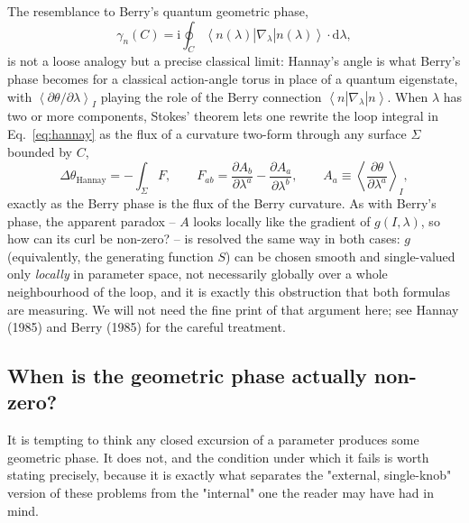 \documentclass[11pt]{book}
\newcommand{\dd}{\mathrm{d}}
\newcommand{\ii}{\mathrm{i}}
\newcommand{\avg}[1]{\left\langle #1 \right\rangle}
\begin{document}
The resemblance to Berry's quantum geometric phase,
\begin{equation}
\gamma_n(C) = \ii\oint_C \avg{n(\lambda)|\nabla_\lambda|n(\lambda)}\cdot\dd\lambda,
\end{equation}
is not a loose analogy but a precise classical limit: Hannay's angle is what Berry's phase becomes
for a classical action-angle torus in place of a quantum eigenstate, with
$\avg{\partial\theta/\partial\lambda}_I$ playing the role of the Berry connection
$\avg{n|\nabla_\lambda|n}$. When $\lambda$ has two or more components, Stokes' theorem lets one
rewrite the loop integral in Eq.~\eqref{eq:hannay} as the flux of a curvature two-form through any
surface $\Sigma$ bounded by $C$,
\begin{equation}
\Delta\theta_{\text{Hannay}} = -\int_\Sigma F, \qquad F_{ab} = \frac{\partial A_b}{\partial
\lambda^a} - \frac{\partial A_a}{\partial\lambda^b}, \qquad A_a \equiv
\avg{\frac{\partial\theta}{\partial\lambda^a}}_I,
\label{eq:curvature}
\end{equation}
exactly as the Berry phase is the flux of the Berry curvature. As with Berry's phase, the apparent
paradox -- $A$ looks locally like the gradient of $g(I,\lambda)$, so how can its curl be non-zero?
-- is resolved the same way in both cases: $g$ (equivalently, the generating function $S$) can be
chosen smooth and single-valued only \emph{locally} in parameter space, not necessarily globally
over a whole neighbourhood of the loop, and it is exactly this obstruction that both formulas are
measuring. We will not need the fine print of that argument here; see Hannay (1985) and Berry
(1985) for the careful treatment.

\subsection{When is the geometric phase actually non-zero?}
\label{sec:onedim}

It is tempting to think any closed excursion of a parameter produces some geometric phase. It does
not, and the condition under which it fails is worth stating precisely, because it is exactly what
separates the "external, single-knob" version of these problems from the "internal" one the reader
may have had in mind.
\end{document}
